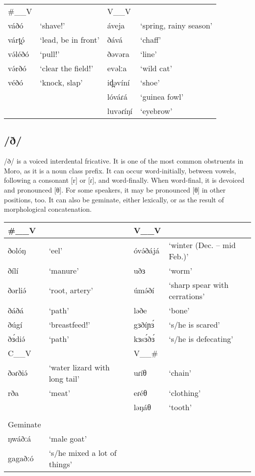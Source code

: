 \ea		
\begin{tabular}[t]{llll}
\#\_\_V	&&	V\_\_V	\\
váðó	&‘shave!’			&áveja	&‘spring, rainy season’\\
várt̪ó	&‘lead, be in front’	&ðává	&‘chaff’\\
və́léðó	&‘pull!’			&ðəvəra &‘line’\\
və́rðó	&‘clear the field!’	&evəlːa	&‘wild cat’\\
véðó	&‘knock, slap’		&id̪əvíní	&‘shoe’\\
						&&lóváɾá	&‘guinea fowl’\\
						&&luvəɾíŋí	&‘eyebrow’
\end{tabular}\label{ex:ch2:28}
\z 

\subsection{/ð/}
/ð/ is a voiced interdental fricative. It is one of the most common obstruents in Moro, as it is a noun class prefix. It can occur word-initially, between vowels, following a consonant [r] or [ɾ], and word-finally. When word-final, it is devoiced and pronounced [θ]. For some speakers, it may be pronounced [θ] in other positions, too. It can also be geminate, either lexically, or as the result of morphological concatenation. 

\ea 
\begin{tabular}[t]{lp{3cm}lp{3cm}}
\#\_\_V	&&	V\_\_V		\\\hline
ðolóŋ	&‘eel’		&óvə́ðájá	&‘winter (Dec. – mid Feb.)’\\
ðílí	&‘manure’	&uðɜ	&‘worm’\\
ðərliə́	&‘root, artery’	&úmə́ðí	&‘sharp spear with cerrations’\\
ðáðá	&‘path’	&ləðe	&‘bone’\\
ðúgí	&‘breastfeed!’	&gɜðíɲɜ́	&‘s/he is scared’\\
ðɜ́diə́	&‘path’	&kɜsɜ́ðɜ́	&‘s/he is defecating’	\\
\midrule
C\_\_V	&&	V\_\_\# 	\\
\midrule
ðəɾðiə́	&‘water lizard with long tail’	&uɾíθ	&‘chain’\\
rða		&‘meat’	&eɾéθ	&‘clothing’\\
				&&ləŋáθ	&‘tooth’\\
&\\			
\midrule
Geminate\\			
\midrule
ŋwáðːá	&‘male goat’		\\
gagaðːó	&‘s/he mixed a lot of things’		
\end{tabular}\label{ex:ch2:29}
\z 

